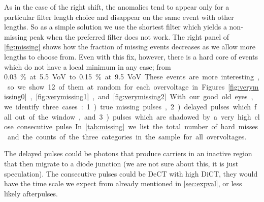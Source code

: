 As in the case of the right shift, the anomalies tend to appear only for a
particular filter length choice and disappear on the same event with other
lengths. So as a simple solution we use the shortest filter which yields a
non-missing peak when the preferred filter does not work. The right panel of
\autoref{fig:missing} shows how the fraction of missing events decreases as we
allow more lengths to choose from. Even with this fix, however, there is a hard
core of events which do not have a local minimum in any case; from \SI{0.03}\%
at \SI{5.5}{VoV} to \SI{0.15}\% at \SI{9.5}{VoV}.

These events are more interesting, so we show 12 of them at random for each
overvoltage in Figures~\ref{fig:verymissing0}, \ref{fig:verymissing1},
and~\ref{fig:verymissing2}. With our good old eyes, we identify three cases:
1)~true missing pulses, 2)~delayed pulses which fall out of the window, and
3)~pulses which are shadowed by a very high close consecutive pulse. In
\autoref{tab:missing} we list the total number of hard misses and the counts
of the three categories in the sample for all overvoltages.

\begin{table}
    
    
    
\end{table}

The delayed pulses could be photons that produce carriers in an inactive region
that then migrate to a diode junction (we are not sure about this, it is just
speculation). The consecutive pulses could be DeCT with high DiCT, they would
have the time scale we expect from \cite[fig.~3.8~p.~54]{savarese2018}
already mentioned in \autoref{sec:expval}, or less likely afterpulses.

